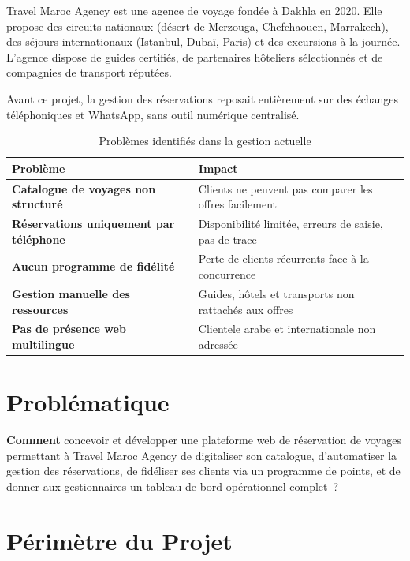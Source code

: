 \documentclass[12pt,a4paper]{report}
\begin{document}
Travel Maroc Agency est une agence de voyage fond\'ee \`a Dakhla en 2020.
Elle propose des circuits nationaux (d\'esert de Merzouga, Chefchaouen,
Marrakech), des s\'ejours internationaux (Istanbul, Duba\"i, Paris) et des
excursions \`a la journ\'ee. L'agence dispose de guides certifi\'es, de partenaires
h\^oteliers s\'electionn\'es et de compagnies de transport r\'eput\'ees.

Avant ce projet, la gestion des r\'eservations reposait enti\`erement sur des
\'echanges t\'el\'ephoniques et WhatsApp, sans outil num\'erique centralis\'e.

\begin{table}[H]
\centering
\caption{Probl\`emes identifi\'es dans la gestion actuelle}
\begin{tabularx}{\textwidth}{>{\bfseries}lX}
  \toprule
  Probl\`eme & Impact \\
  \midrule
  Catalogue de voyages non structur\'e &
    Clients ne peuvent pas comparer les offres facilement \\
  R\'eservations uniquement par t\'el\'ephone &
    Disponibilit\'e limit\'ee, erreurs de saisie, pas de trace \\
  Aucun programme de fid\'elit\'e &
    Perte de clients r\'ecurrents face \`a la concurrence \\
  Gestion manuelle des ressources &
    Guides, h\^otels et transports non rattach\'es aux offres \\
  Pas de pr\'esence web multilingue &
    Clientele arabe et internationale non adress\'ee \\
  \bottomrule
\end{tabularx}
\end{table}

\section{Probl\'ematique}

\begin{infobox}
\textbf{Comment} concevoir et d\'evelopper une plateforme web de r\'eservation
de voyages permettant \`a Travel Maroc Agency de digitaliser son catalogue,
d'automatiser la gestion des r\'eservations, de fid\'eliser ses clients via un
programme de points, et de donner aux gestionnaires un tableau de bord
op\'erationnel complet~?
\end{infobox}

\section{P\'erim\`etre du Projet}
\end{document}
